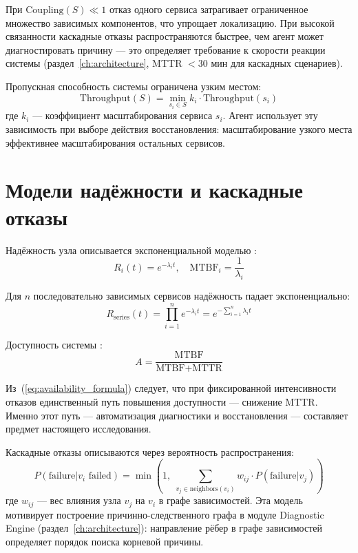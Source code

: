 При $\text{Coupling}(S) \ll 1$ отказ одного сервиса затрагивает ограниченное множество зависимых компонентов, что упрощает локализацию. При высокой связанности каскадные отказы распространяются быстрее, чем агент может диагностировать причину --- это определяет требование к скорости реакции системы (раздел~\ref{ch:architecture}, MTTR $< 30$ мин для каскадных сценариев).

Пропускная способность системы ограничена узким местом:
\begin{equation}
\text{Throughput}(S) = \min_{s_i \in S} k_i \cdot \text{Throughput}(s_i)
\label{eq:system_throughput}
\end{equation}
где $k_i$ --- коэффициент масштабирования сервиса $s_i$. Агент использует эту зависимость при выборе действия восстановления: масштабирование узкого места эффективнее масштабирования остальных сервисов.

\section{Модели надёжности и каскадные отказы}

Надёжность узла описывается экспоненциальной моделью \cite{ieee_distributed_systems,self_healing_systems}:
\begin{equation}
R_i(t) = e^{-\lambda_i t}, \quad \text{MTBF}_i = \frac{1}{\lambda_i}
\label{eq:failure_probability}
\end{equation}

Для $n$ последовательно зависимых сервисов надёжность падает экспоненциально:
\begin{equation}
R_{\text{series}}(t) = \prod_{i=1}^{n} e^{-\lambda_i t} = e^{-\sum_{i=1}^{n} \lambda_i t}
\label{eq:series_reliability}
\end{equation}

Доступность системы \cite{iso_25010,google_sre_book}:
\begin{equation}
A = \frac{\text{MTBF}}{\text{MTBF} + \text{MTTR}}
\label{eq:availability_formula}
\end{equation}

Из~(\ref{eq:availability_formula}) следует, что при фиксированной интенсивности отказов единственный путь повышения доступности --- снижение MTTR. Именно этот путь --- автоматизация диагностики и восстановления --- составляет предмет настоящего исследования.

Каскадные отказы описываются через вероятность распространения:
\begin{equation}
P(\text{failure}|v_i \text{ failed}) = \min\!\left(1,\; \sum_{v_j \in \text{neighbors}(v_i)} w_{ij} \cdot P(\text{failure}|v_j)\right)
\label{eq:cascade_failure}
\end{equation}
где $w_{ij}$ --- вес влияния узла $v_j$ на $v_i$ в графе зависимостей. Эта модель мотивирует построение причинно-следственного графа в модуле Diagnostic Engine (раздел~\ref{ch:architecture}): направление рёбер в графе зависимостей определяет порядок поиска корневой причины.

